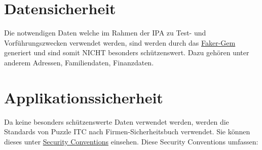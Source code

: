 \section{Datensicherheit}
Die notwendigen Daten welche im Rahmen der IPA zu Test- und Vorführungszwecken verwendet werden,
sind werden durch das \href{https://github.com/faker-ruby/faker}{Faker-Gem} generiert und sind somit NICHT 
besonders schützenswert. Dazu gehören unter anderem Adressen, Familiendaten, Finanzdaten.

\section{Applikationssicherheit}

Da keine besonders schützenswerte Daten verwendet werden, werden die Standards von
Puzzle ITC nach Firmen-Sicherheitsbuch verwendet. Sie können dieses unter \hyperref[sec:secconv]{Security Conventions}
einsehen. Diese Security Conventions umfassen:

